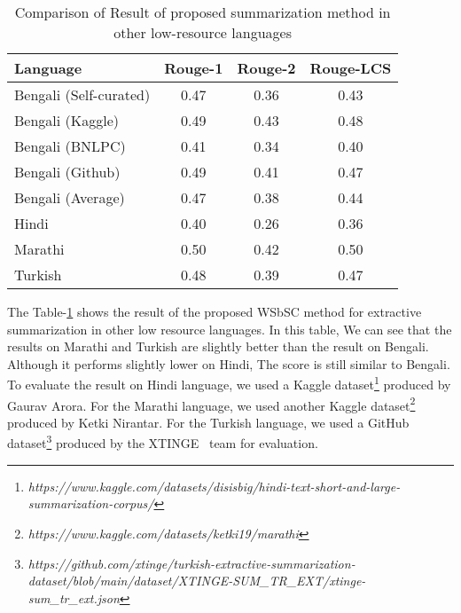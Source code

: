 \begin{table}[]
    \centering
    \begin{tabular}{lccc}\hline
        Language              	& Rouge-1   & Rouge-2   & Rouge-LCS \\\hline
        Bengali (Self-curated)	& 0.47      & 0.36      & 0.43      \\
        Bengali (Kaggle)   		& 0.49      & 0.43      & 0.48      \\
        Bengali (BNLPC)   		& 0.41      & 0.34      & 0.40      \\
        Bengali (Github)   		& 0.49      & 0.41      & 0.47      \\
        Bengali (Average)       & 0.47      & 0.38      & 0.44      \\\hline
        Hindi                   & 0.40      & 0.26      & 0.36      \\\hline
        Marathi                 & 0.50	    & 0.42      & 0.50      \\\hline
        Turkish                 & 0.48      & 0.39      & 0.47      \\\hline
    \end{tabular}
    \caption{Comparison of Result of proposed summarization method in other low-resource languages}
    \label{tab:other_language}
\end{table}

The Table-\ref{tab:other_language} shows the result of the proposed WSbSC method for extractive summarization in other low resource languages. In this table, We can see that the results on Marathi and Turkish are slightly better than the result on Bengali. Although it performs slightly lower on Hindi, The score is still similar to Bengali. To evaluate the result on Hindi language, we used a Kaggle dataset\footnote{\textit{https://www.kaggle.com/datasets/disisbig/hindi-text-short-and-large-summarization-corpus/}} produced by Gaurav Arora. For the Marathi language, we used another Kaggle dataset\footnote{\textit{https://www.kaggle.com/datasets/ketki19/marathi}} produced by Ketki Nirantar. For the Turkish language, we used a GitHub dataset\footnote{\textit{https://github.com/xtinge/turkish-extractive-summarization-dataset/blob/main/dataset/XTINGE-SUM\_TR\_EXT/xtinge-sum\_tr\_ext.json}} produced by the XTINGE~\cite{Demir-2024-xtinge_turkish_extractive} team for evaluation. 
